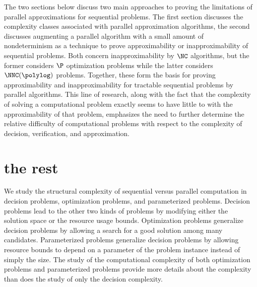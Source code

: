 \documentclass[draft]{article}
\begin{document}
%
The two sections below discuss two main approaches to proving the limitations of parallel approximations for sequential problems.
The first section discusses the complexity classes associated with parallel approximation algorithms, the second discusses augmenting a parallel algorithm with a small amount of nondeterminism as a technique to prove approximability or inapproximability of sequential problems.
Both concern inapproximability by $\NC$ algorithms, but the former considers $\P$ optimization problems while the latter considers $\NNC(\polylog)$ problems.
Together, these form the basis for proving approximability and inapproximability for tractable sequential problems by parallel algorithms.
This line of research, along with the fact that the complexity of solving a computational problem exactly seems to have little to with the approximability of that problem, emphasizes the need to further determine the relative difficulty of computational problems with respect to the complexity of decision, verification, and approximation.

\section{the rest}

We study the structural complexity of sequential versus parallel computation in decision problems, optimization problems, and parameterized problems.
Decision problems lead to the other two kinds of problems by modifying either the solution space or the resource usage bounds.
Optimization problems generalize decision problems by allowing a search for a good solution among many candidates.
Parameterized problems generalize decision problems by allowing resource bounds to depend on a parameter of the problem instance instead of simply the size.
The study of the computational complexity of both optimization problems and parameterized problems provide more details about the complexity than does the study of only the decision complexity.

\begin{minipage}[t]{0.31\linewidth}
  \centering
  
\end{minipage}%
\begin{minipage}[t]{0.31\linewidth}
  \centering
  
\end{minipage}%
\begin{minipage}[t]{0.31\linewidth}
  \centering
  
\end{minipage}
\end{document}
